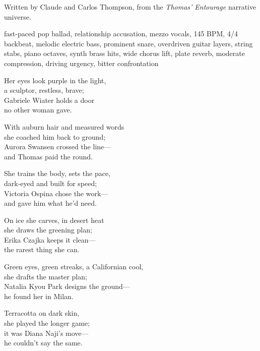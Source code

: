 
\begin{notes}
Written by Claude and Carlos Thompson, from the \emph{Thomas’ Entourage} narrative universe.
\end{notes}
\begin{style}
fast-paced pop ballad, relationship accusation, mezzo vocals, 145 BPM, 4/4 backbeat, melodic electric bass, prominent snare, overdriven guitar layers, string stabs, piano octaves, synth brass hits, wide chorus lift, plate reverb, moderate compression, driving urgency, bitter confrontation
\end{style}
\begin{lyrics}
Her eyes look purple in the light,\\
a sculptor, restless, brave;\\
Gabriele Wiater holds a door\\
no other woman gave.

With auburn hair and measured words\\
she coached him back to ground;\\
Aurora Swansen crossed the line—\\
and Thomas paid the round.

She trains the body, sets the pace,\\
dark-eyed and built for speed;\\
Victoria Ospina chose the work—\\
and gave him what he'd need.

On ice she carves, in desert heat\\
she draws the greening plan;\\
Erika Czajka keeps it clean—\\
the rarest thing she can.

Green eyes, green streaks, a Californian cool,\\
she drafts the master plan;\\
Natalia Kyou Park designs the ground—\\
he found her in Milan.

Terracotta on dark skin,\\
she played the longer game;\\
it was Diana Naji's move—\\
he couldn't say the same.


\end{lyrics}
